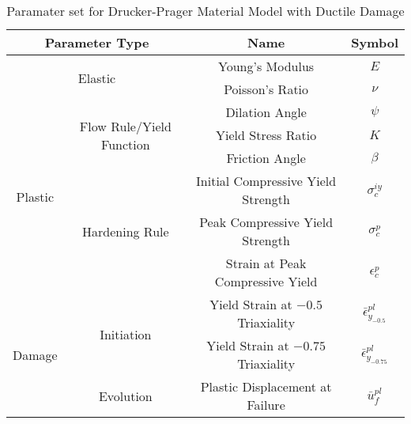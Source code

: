 \begin{table}[!htbp]
\centering
\caption{Paramater set for Drucker-Prager Material Model with Ductile Damage}
\label{tab:druckerParameters}
\begin{tabular}{@{}cccc@{}}
\toprule
\multicolumn{2}{c}{\textbf{Parameter Type}}                                                                      & \textbf{Name}                              & \textbf{Symbol}                   \\ \midrule
\multicolumn{2}{c}{\multirow{2}{*}{Elastic}}                                                                     & Young's Modulus                            & $E$                               \\
\multicolumn{2}{c}{}                                                                                             & Poisson's Ratio                            & $\nu$                             \\ \cmidrule{1-2}
\multirow{6}{*}{Plastic} & \multirow{3}{*}{Flow Rule/Yield Function} & Dilation Angle                             & $\psi$                            \\
                         &                                                                                       & Yield Stress Ratio                         & $K$                               \\
                         &                                                                                       & Friction Angle                             & $\beta$                           \\ \cmidrule{2-2}
                         & \multirow{3}{*}{Hardening Rule}                                                       & Initial Compressive Yield Strength         & $\sigma_c^{iy}$                   \\
                         &                                                                                       & Peak Compressive Yield Strength & $\sigma_c^{p}$                    \\
                         &                                                                                       & Strain at Peak Compressive Yield           & $\epsilon_c^{p}$                 \\ \cmidrule{1-2}
\multirow{3}{*}{Damage}  & \multirow{2}{*}{Initiation}                                                           & Yield Strain at $-0.5$ Triaxiality         & $\bar{\epsilon}^{pl}_{y_{-0.5}}$  \\
                         &                                                                                       & Yield Strain at $-0.75$ Triaxiality        & $\bar{\epsilon}^{pl}_{y_{-0.75}}$ \\ \cmidrule{2-2}
                         & Evolution                                                                             & Plastic Displacement at Failure            & $\bar{u}^{pl}_f$                  \\ \bottomrule
\end{tabular}
\end{table}
